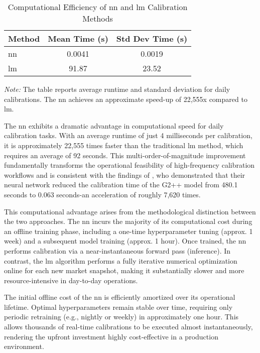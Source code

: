 \begin{table}[H]
	\centering
	\begin{threeparttable}
		\caption{Computational Efficiency of \ac{nn} and \ac{lm} Calibration Methods}
		\label{tab:comp_efficiency}
		\begin{tabular}{lcc}
			\toprule
			Method  & Mean Time (s) & Std Dev Time (s) \\
			\midrule
			\ac{nn} & 0.0041        & 0.0019           \\
			\ac{lm} & 91.87         & 23.52            \\
			\bottomrule
		\end{tabular}
		\begin{tablenotes}
			\footnotesize
			\item \textit{Note:} The table reports average runtime and standard deviation for daily calibrations. The \ac{nn} achieves an approximate speed-up of 22,555x compared to \ac{lm}.
		\end{tablenotes}
	\end{threeparttable}
\end{table}

The \ac{nn} exhibits a dramatic advantage in computational speed for daily calibration tasks. With an average runtime of just 4 milliseconds per calibration, it is approximately 22,555 times faster than the traditional \ac{lm} method, which requires an average of 92 seconds. This multi-order-of-magnitude improvement fundamentally transforms the operational feasibility of high-frequency calibration workflows and is consistent with the findings of \textcite{alaya2021deep}, who demonstrated that their neural network reduced the calibration time of the G2++ model from 480.1 seconds to 0.063 seconds-an acceleration of roughly 7,620 times.

This computational advantage arises from the methodological distinction between the two approaches. The \ac{nn} incurs the majority of its computational cost during an offline training phase, including a one-time hyperparameter tuning (approx. 1 week) and a subsequent model training (approx. 1 hour). Once trained, the \ac{nn} performs calibration via a near-instantaneous forward pass (inference). In contrast, the \ac{lm} algorithm performs a fully iterative numerical optimization online for each new market snapshot, making it substantially slower and more resource-intensive in day-to-day operations.

The initial offline cost of the \ac{nn} is efficiently amortized over its operational lifetime. Optimal hyperparameters remain stable over time, requiring only periodic retraining (e.g., nightly or weekly) in approximately one hour. This allows thousands of real-time calibrations to be executed almost instantaneously, rendering the upfront investment highly cost-effective in a production environment.

